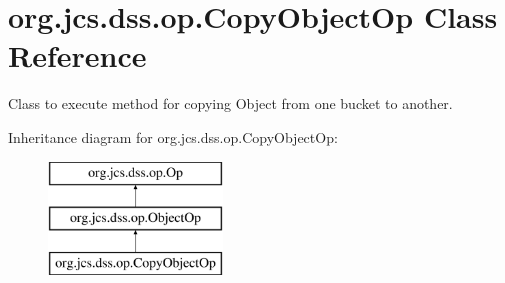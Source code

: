 \hypertarget{classorg_1_1jcs_1_1dss_1_1op_1_1CopyObjectOp}{}\section{org.\+jcs.\+dss.\+op.\+Copy\+Object\+Op Class Reference}
\label{classorg_1_1jcs_1_1dss_1_1op_1_1CopyObjectOp}


Class to execute method for copying Object from one bucket to another.  


Inheritance diagram for org.\+jcs.\+dss.\+op.\+Copy\+Object\+Op\+:\begin{figure}[H]
\begin{center}
\leavevmode
\includegraphics[height=3.000000cm]{classorg_1_1jcs_1_1dss_1_1op_1_1CopyObjectOp}
\end{center}
\end{figure}
